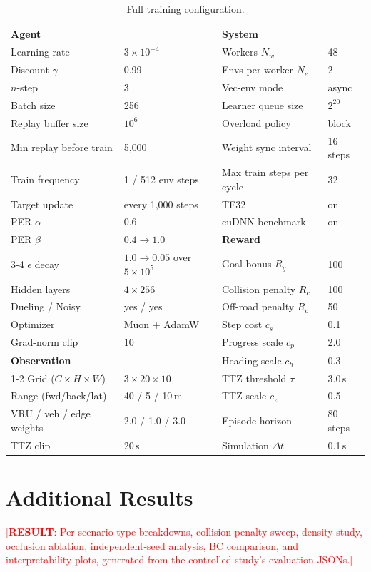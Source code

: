 \documentclass{article}
\newcommand{\results}[1]{\textcolor{red}{[\textbf{RESULT}: #1]}}
\begin{document}
\begin{table}[h]
\centering
\caption{Full training configuration.}
\label{tab:hyper}
\begin{tabular}{llll}
\toprule
\multicolumn{2}{l}{\textbf{Agent}} & \multicolumn{2}{l}{\textbf{System}} \\
\midrule
Learning rate            & $3 \times 10^{-4}$ & Workers $N_w$              & 48 \\
Discount $\gamma$        & 0.99               & Envs per worker $N_e$      & 2 \\
$n$-step                 & 3                  & Vec-env mode               & async \\
Batch size               & 256                & Learner queue size         & $2^{20}$ \\
Replay buffer size       & $10^6$             & Overload policy            & block \\
Min replay before train  & 5{,}000            & Weight sync interval       & 16 steps \\
Train frequency          & 1 / 512 env steps  & Max train steps per cycle  & 32 \\
Target update            & every 1{,}000 steps& TF32                       & on \\
PER $\alpha$             & 0.6                & cuDNN benchmark            & on \\
PER $\beta$              & $0.4 \to 1.0$      & \textbf{Reward}            & \\
\cmidrule(lr){3-4}
$\epsilon$ decay         & $1.0 \to 0.05$ over $5{\times}10^5$ & Goal bonus $R_g$ & 100 \\
Hidden layers            & $4 \times 256$     & Collision penalty $R_c$    & 100 \\
Dueling / Noisy          & yes / yes          & Off-road penalty $R_o$     & 50 \\
Optimizer                & Muon + AdamW       & Step cost $c_s$            & 0.1 \\
Grad-norm clip           & 10                 & Progress scale $c_p$       & 2.0 \\
\textbf{Observation}     &                    & Heading scale $c_h$        & 0.3 \\
\cmidrule(lr){1-2}
Grid ($C{\times}H{\times}W$) & $3 \times 20 \times 10$ & TTZ threshold $\tau$ & 3.0\,s \\
Range (fwd/back/lat)     & 40 / 5 / 10\,m     & TTZ scale $c_z$            & 0.5 \\
VRU / veh / edge weights & 2.0 / 1.0 / 3.0    & Episode horizon            & 80 steps \\
TTZ clip                 & 20\,s              & Simulation $\Delta t$      & 0.1\,s \\
\bottomrule
\end{tabular}
\end{table}

\section{Additional Results}
\label{app:additional}

\results{Per-scenario-type breakdowns, collision-penalty sweep, density
study, occlusion ablation, independent-seed analysis, BC comparison, and
interpretability plots, generated from the controlled study's evaluation
JSONs.}
\end{document}
